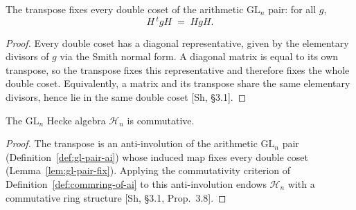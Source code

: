 \begin{lemma}\label{lem:gl-pair-fix}
\leanok
{}
The transpose fixes every double coset of the arithmetic $\mathrm{GL}_n$ pair: for all $g$,
\[
  H\,{}^{t}gH \;=\; HgH .
\]
\end{lemma}

\begin{proof}\leanok
{}
Every double coset has a diagonal representative, given by the elementary divisors of $g$ via
the Smith normal form. A diagonal matrix is equal to its own transpose, so the transpose fixes
this representative and therefore fixes the whole double coset. Equivalently, a matrix and its
transpose share the same elementary divisors, hence lie in the same double coset [Sh, \S3.1].
\end{proof}

\begin{theorem}\label{thm:commring-hecke-algebra}
\leanok
{}
The $\mathrm{GL}_n$ Hecke algebra $\mathcal{H}_n$ is commutative.
\end{theorem}

\begin{proof}\leanok
{}
The transpose is an anti-involution of the arithmetic $\mathrm{GL}_n$ pair
(Definition~\ref{def:gl-pair-ai}) whose induced map fixes every double coset
(Lemma~\ref{lem:gl-pair-fix}). Applying the commutativity criterion of
Definition~\ref{def:commring-of-ai} to this anti-involution endows $\mathcal{H}_n$ with a
commutative ring structure [Sh, \S3.1, Prop.~3.8].
\end{proof}
